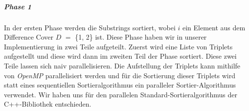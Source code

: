 \subparagraph*{Phase 1}

In der ersten Phase werden die Substrings  sortiert, wobei $i$ ein Element aus dem Difference Cover \(D\) $=$ \{1, 2\} ist. Diese Phase haben wir in unserer Implementierung in zwei Teile aufgeteilt. Zuerst wird eine Liste von Triplets aufgestellt und diese wird dann im zweiten Teil der Phase sortiert.
Diese zwei Teile lassen sich naiv parallelisieren. Die Aufstellung der Triplets kann mithilfe von \emph{OpenMP} parallelisiert werden und für die Sortierung dieser Triplets wird statt eines sequentiellen Sortieralgorithmus ein paralleler Sortier-Algorithmus verwendet. Wir haben uns für den parallelen Standard-Sortieralgorithmus der C++-Bibliothek entschieden.
